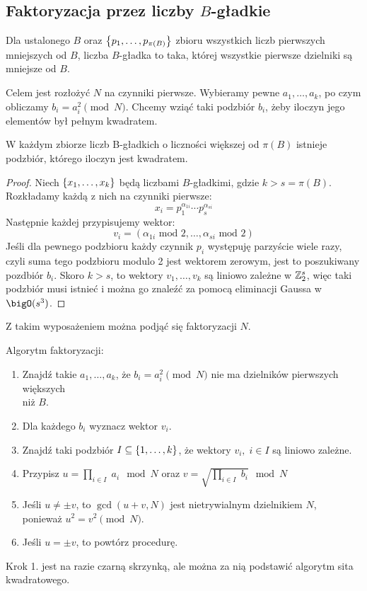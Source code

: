 \subsection{Faktoryzacja przez liczby \( B \)-gładkie}
\begin{definition}
    Dla ustalonego \( B \) oraz \( \set{p_1, \dots, p_{\pi(B)}} \) zbioru wszystkich liczb pierwszych mniejszych od \( B \), liczba \( B \)-gładka to taka, której wszystkie pierwsze dzielniki są mniejsze od \( B \).
\end{definition}
    
Celem jest rozłożyć \( N \) na czynniki pierwsze. Wybieramy pewne \( a_1, \dots, a_k \), po czym obliczamy \( b_i = a_i^2 \pmod{N} \). Chcemy wziąć taki podzbiór \(b_i \), żeby iloczyn jego elementów był pełnym kwadratem.

\begin{lemma}
    W każdym zbiorze liczb B-gładkich o liczności większej od \( \pi(B) \) istnieje podzbiór, którego iloczyn jest kwadratem.
\end{lemma}
\begin{proof}
    Niech \( \set{x_1, \dots, x_k} \) będą liczbami \( B \)-gładkimi, gdzie \( k > s = \pi(B) \). Rozkładamy każdą z nich na czynniki pierwsze:
    \[
        x_i = p_1^{\alpha_{1i}} \cdots p_s^{\alpha_{si}}
    \]
    Następnie każdej przypisujemy wektor:
    \[
        v_i = (\alpha_{1i} \text{ mod } 2, \dots, \alpha_{si} \text{ mod } 2)
    \]
    Jeśli dla pewnego podzbioru każdy czynnik \( p_i \) występuję parzyście wiele razy, czyli suma tego podzbioru modulo 2 jest wektorem zerowym, jest to poszukiwany pozdbiór \( b_i \).
    Skoro \( k > s \), to wektory \( v_1, \dots, v_k \) są liniowo zależne w \( \mathbb{Z}_2^s \), więc taki podzbiór musi istnieć i można go znaleźć za pomocą eliminacji Gaussa w \( \bigO(s^3) \).
\end{proof}
Z takim wyposażeniem można podjąć się faktoryzacji \( N \).
\begin{greyframe}
    Algorytm faktoryzacji:
    \begin{enumerate}
        \item Znajdź takie \( a_1, \dots, a_k \), że \( b_i = a_i^2 \pmod{N} \) nie ma dzielników pierwszych większych \\ niż \( B \).
        \item Dla każdego \( b_i \) wyznacz wektor \( v_i \).
        \item Znajdź taki podzbiór \( I \subseteq \set{1, \dots, k} \), że wektory \( v_i,\; i \in I \) są liniowo zależne.
        \item Przypisz \( u = \prod_{i \in I}\; a_i \mod N \) oraz \( v = \sqrt{\prod_{i \in I}\; b_i} \mod N \)
        \item Jeśli \( u \neq \pm v \), to \( \gcd(u + v, N) \) jest nietrywialnym dzielnikiem \( N \), \\ ponieważ \( u^2 = v^2 \pmod{N} \).
        \item Jeśli \( u = \pm v \), to powtórz procedurę.
    \end{enumerate}
\end{greyframe}
Krok 1. jest na razie czarną skrzynką, ale można za nią podstawić algorytm sita kwadratowego.

